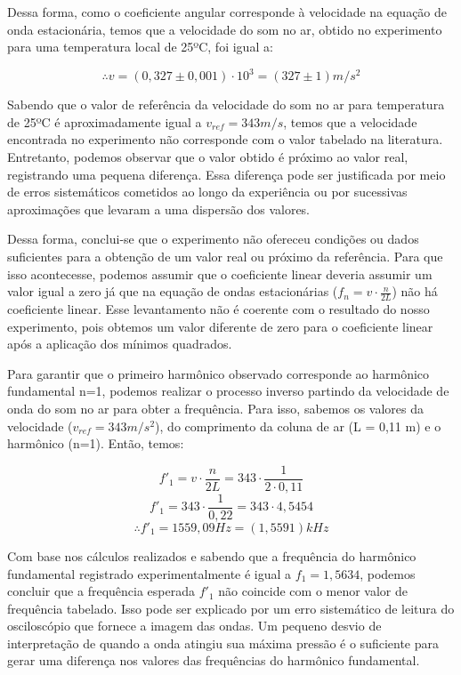Dessa forma, como o coeficiente angular corresponde à velocidade na equação de onda estacionária, temos que a velocidade do som no ar, obtido no experimento para uma temperatura local de 25ºC, foi igual a:

\[ \therefore v = (0,327 \pm 0,001) \cdot 10^3 = (327 \pm 1) m/s^2 \] 

Sabendo que o valor de referência da velocidade do som no ar para temperatura de 25ºC é aproximadamente igual a $v_{ref}= 343 m/s$, temos que a velocidade encontrada no experimento não corresponde com o valor tabelado na literatura. Entretanto, podemos observar que o valor obtido é próximo ao valor real, registrando uma pequena diferença. Essa diferença pode ser justificada por meio de erros sistemáticos cometidos ao longo da experiência ou por sucessivas aproximações que levaram a uma dispersão dos valores.

Dessa forma, conclui-se que o experimento não ofereceu condições ou dados suficientes para a obtenção de um valor real ou próximo da referência. Para que isso acontecesse, podemos assumir que o coeficiente linear deveria assumir um valor igual a zero já que na equação de ondas estacionárias ($f_n = v \cdot \frac{n}{2L}$) não há coeficiente linear. Esse levantamento não é coerente com o resultado do nosso experimento, pois obtemos um valor diferente de zero para o coeficiente linear após a aplicação dos mínimos quadrados.

Para garantir que o primeiro harmônico observado corresponde ao harmônico fundamental n=1, podemos realizar o processo inverso partindo da velocidade de onda do som no ar para obter a frequência. Para isso, sabemos os valores da velocidade ($v_{ref} = 343 m/s^2$), do comprimento da coluna de ar (L = 0,11 m) e o harmônico (n=1). Então, temos:

\[  f'_1 = v \cdot \frac{n}{2L} = 343 \cdot \frac{1}{2 \cdot 0,11} \]
\[  f'_1 = 343 \cdot \frac{1}{0,22} = 343 \cdot 4,5454 \]
\[  \therefore f'_1 = 1559,09 Hz = (1,5591) kHz \]

Com base nos cálculos realizados e sabendo que a frequência do harmônico fundamental registrado experimentalmente é igual a $f_1 = 1,5634$, podemos concluir que a frequência esperada $f'_1$ não coincide com o menor valor de frequência tabelado. Isso pode ser explicado por um erro sistemático de leitura do osciloscópio que fornece a imagem das ondas. Um pequeno desvio de interpretação de quando a onda atingiu sua máxima pressão é o suficiente para gerar uma diferença nos valores das frequências do harmônico fundamental.
